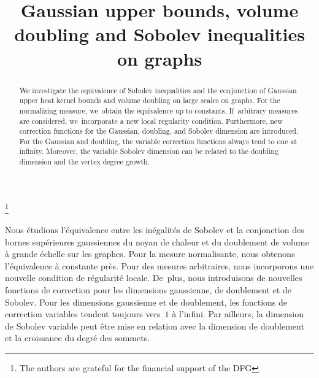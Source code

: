 \documentclass[JEP,XML,SOM,Unicode,published]{cedram}
\theoremstyle{plain}
\theoremstyle{definition}
\begin{document}
\title{Gaussian upper bounds, volume doubling and Sobolev inequalities on graphs}

\author[\initial{M.} \lastname{Keller}]{ }
\address{Universität Potsdam, Institut für Mathematik,\\
14476 Potsdam, Germany}

\author[\initial{C.} \lastname{Rose}]{ }
\address{Universität Potsdam, Institut für Mathematik,\\
14476 Potsdam, Germany}

\thanks{The authors are grateful for the financial support of the DFG}

\begin{abstract}
We investigate the equivalence of Sobolev inequalities and the conjunction of Gaussian upper heat kernel bounds and volume doubling on large scales on graphs. For the normalizing measure, we~obtain the equivalence up to constants. If~arbitrary measures are considered, we~incorporate a new local regularity condition. Furthermore, new correction functions for the Gaussian, doubling, and Sobolev dimension are introduced. For the Gaussian and doubling, the variable correction functions always tend to one at infinity. Moreover, the variable Sobolev dimension can be related to the doubling dimension and the vertex degree growth.
\end{abstract}





\begin{altabstract}
Nous étudions l'équivalence entre les inégalités de Sobolev et la conjonction des bornes supérieures gaussiennes du noyau de chaleur et du doublement de volume à grande échelle sur les graphes. Pour la mesure normalisante, nous obtenons l'équivalence à constante près. Pour des mesures arbitraires, nous incorporons une nouvelle condition de régularité locale. De~plus, nous introduisons de nouvelles fonctions de correction pour les dimensions gaussienne, de doublement et de Sobolev. Pour les dimensions gaussienne et de doublement, les fonctions de correction variables tendent toujours vers~$1$ à l'infini. Par ailleurs, la dimension de Sobolev variable peut être mise en relation avec la dimension de doublement et la croissance du degré des sommets.
\end{altabstract}
\end{document}
